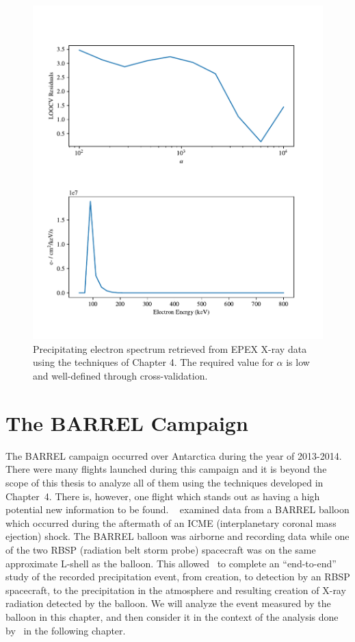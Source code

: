 \begin{figure}[p]
    \centering
    \includegraphics[width=1.0\textwidth]{figures/chapter_5/epex_tk_inv/epex_tk_inv.pdf}
    \caption{Precipitating electron spectrum retrieved from EPEX X-ray data using the techniques of Chapter 4. The required value for $\alpha$ is low and well-defined through cross-validation.}
    \label{epex_tk_inv}
\end{figure}

\section{The BARREL Campaign}

The BARREL campaign occurred over Antarctica during the year of 2013-2014. There were many flights launched during this campaign and it is beyond the scope of this thesis to analyze all of them using the techniques developed in Chapter~4. There is, however, one flight which stands out as having a high potential new information to be found. ~\citet{Halford2015} examined data from a BARREL balloon which occurred during the aftermath of an ICME (interplanetary coronal mass ejection) shock. The BARREL balloon was airborne and recording data while one of the two RBSP (radiation belt storm probe) spacecraft was on the same approximate L-shell as the balloon. This allowed~\citet{Halford2015} to complete an ``end-to-end'' study of the recorded precipitation event, from creation, to detection by an RBSP spacecraft, to the precipitation in the atmosphere and resulting creation of X-ray radiation detected by the balloon. We will analyze the event measured by the balloon in this chapter, and then consider it in the context of the analysis done by~\citet{Halford2015} in the following chapter. 

